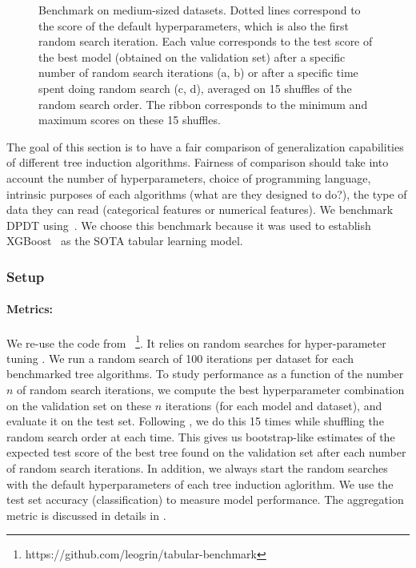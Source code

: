 \begin{figure}
\begin{minipage}{0.24\textwidth}
        \label{fig:classif-cat-all}
    \end{minipage}
\caption{Benchmark on medium-sized datasets. Dotted lines correspond to the score of the default hyperparameters, which is also the first random search iteration. Each value corresponds to the test score of the best model (obtained on the validation set) after a specific number of random search iterations (a, b) or after a specific time spent doing random search (c, d), averaged on 15 shuffles of the random search order. The ribbon corresponds to the minimum and maximum scores on these 15 shuffles.}\label{fig:gen-classif}
\end{figure}

The goal of this section is to have a fair comparison of generalization capabilities of different tree induction algorithms. Fairness of comparison should take into account the number of hyperparameters, choice of programming language, intrinsic purposes of each algorithms (what are they designed to do?), the type of data they can read (categorical features or numerical features). We benchmark DPDT using~\cite{grinsztajn2022tree}. We choose this benchmark because it was used to establish XGBoost~\cite{xgb} as the SOTA tabular learning model. 

\subsubsection{Setup}

\paragraph{Metrics:} We re-use the code from \cite{grinsztajn2022tree}~\footnote{https://github.com/leogrin/tabular-benchmark}. It relies on random searches for hyper-parameter tuning \cite{pmlr-v28-bergstra13}. We run a random search of 100 iterations per dataset for each benchmarked tree algorithms. To study performance as a function of the number $n$ of random search iterations, we compute the best hyperparameter combination on the validation set on these $n$ iterations (for each model and dataset), and evaluate it on the test set. Following \cite{grinsztajn2022tree}, we do this 15 times while shuffling the random search order at each time. This gives us bootstrap-like estimates of the expected test score of the best tree found on the validation set after each number of random search iterations. In addition, we always start the random searches with the default hyperparameters of each tree induction aglorithm. We use the test set accuracy (classification) to measure model performance. The aggregation metric is discussed in details in \cite[Section 3]{grinsztajn2022tree}.

